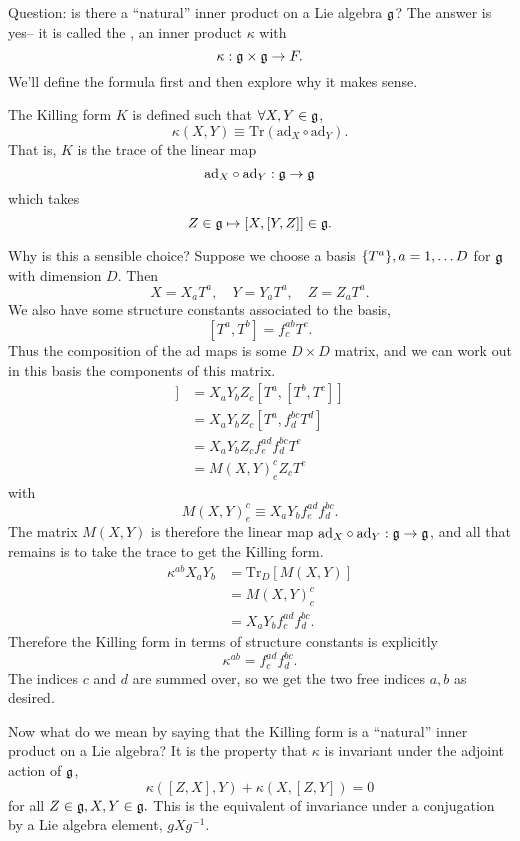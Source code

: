 Question: is there a ``natural'' inner product on a Lie algebra $\mathfrak{g}$? The answer is yes-- it is called the , an inner product $\kappa$ with
$$\kappa:\mathfrak{g} \times \mathfrak{g} \to F.$$
We'll define the formula first and then explore why it makes sense.
\begin{defn}
The Killing form $K$ is defined such that $\forall X,Y \in \mathfrak{g}$,
$$\kappa(X,Y)\equiv \text{Tr}(\text{ad}_X \circ \text{ad}_Y).$$
That is, $K$ is the trace of the linear map
$$\text{ad}_X \circ \text{ad}_Y: \mathfrak{g} \to \mathfrak{g}$$
which takes
$$Z\in \mathfrak{g} \mapsto [X,[Y,Z]] \in \mathfrak{g}.$$
\end{defn}
Why is this a sensible choice? Suppose we choose a basis $\{T^a\},a=1,\ldots D$ for $\mathfrak{g}$ with dimension $D$. Then
$$X=X_a T^a,\quad Y=Y_a T^a, \quad Z=Z_a T^a.$$
We also have some structure constants associated to the basis,
$$[T^a,T^b]=f^{ab}_c T^c.$$
Thus the composition of the ad maps is some $D\times D$ matrix, and we can work out in this basis the components of this matrix.
\begin{align*}
[X,[Y,Z]]&= X_a Y_b Z_c [T^a,[T^b,T^c]]\\
&= X_a Y_b Z_c [T^a,f^{bc}_d T^d]\\
&= X_a Y_b Z_c f^{ad}_e f^{bc}_d T^e\\
&= M(X,Y)^c_e Z_c T^e
\end{align*}
with 
$$M(X,Y)^c_e \equiv X_a Y_b f^{ad}_e f^{bc}_d.$$
The matrix $M(X,Y)$ is therefore the linear map $\text{ad}_X\circ \text{ad}_Y:\mathfrak{g} \to \mathfrak{g}$, and all that remains is to take the trace to get the Killing form.
\begin{align*}
\kappa^{ab}X_a Y_b &= \text{Tr}_D[M(X,Y)]\\
&= M(X,Y)^c_c\\
&= X_a Y_b f^{ad}_c f^{bc}_d.
\end{align*}
Therefore the Killing form in terms of structure constants is explicitly
$$\kappa^{ab}=f^{ad}_c f^{bc}_d.$$
The indices $c$ and $d$ are summed over, so we get the two free indices $a,b$ as desired.

Now what do we mean by saying that the Killing form is a ``natural'' inner product on a Lie algebra? It is the property that $\kappa$ is invariant under the adjoint action of $\mathfrak{g}$,
$$\kappa([Z,X],Y)+\kappa(X,[Z,Y])=0$$ for all $Z\in \mathfrak{g}, X,Y \in \mathfrak{g}.$ This is the equivalent of invariance under a conjugation by a Lie algebra element, $g X g^{-1}.$

